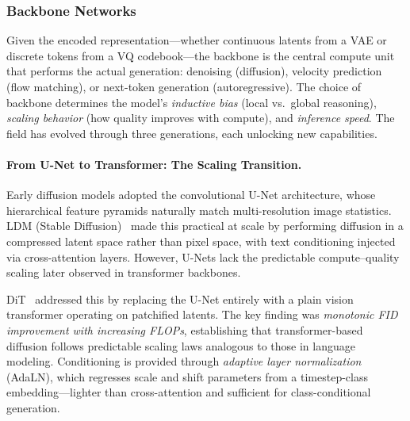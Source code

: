 \documentclass{llmxive}
\begin{document}
\subsubsection{Backbone Networks}
\label{sec:arch_backbone}

Given the encoded representation---whether continuous latents from a VAE or discrete tokens from a VQ codebook---the backbone is the central compute unit that performs the actual generation: denoising (diffusion), velocity prediction (flow matching), or next-token generation (autoregressive). The choice of backbone determines the model's \emph{inductive bias} (local vs.\ global reasoning), \emph{scaling behavior} (how quality improves with compute), and \emph{inference speed}. The field has evolved through three generations, each unlocking new capabilities.

\paragraph{From U-Net to Transformer: The Scaling Transition.}
Early diffusion models adopted the convolutional U-Net architecture, whose hierarchical feature pyramids naturally match multi-resolution image statistics. LDM (Stable Diffusion)~\citep{rombach2022stablediffusion} made this practical at scale by performing diffusion in a compressed latent space rather than pixel space, with text conditioning injected via cross-attention layers. However, U-Nets lack the predictable compute--quality scaling later observed in transformer backbones.

DiT~\citep{peebles2023scalable} addressed this by replacing the U-Net entirely with a plain vision transformer operating on patchified latents. The key finding was \emph{monotonic FID improvement with increasing FLOPs}, establishing that transformer-based diffusion follows predictable scaling laws analogous to those in language modeling. Conditioning is provided through \emph{adaptive layer normalization} (AdaLN), which regresses scale and shift parameters from a timestep-class embedding---lighter than cross-attention and sufficient for class-conditional generation.
\end{document}
